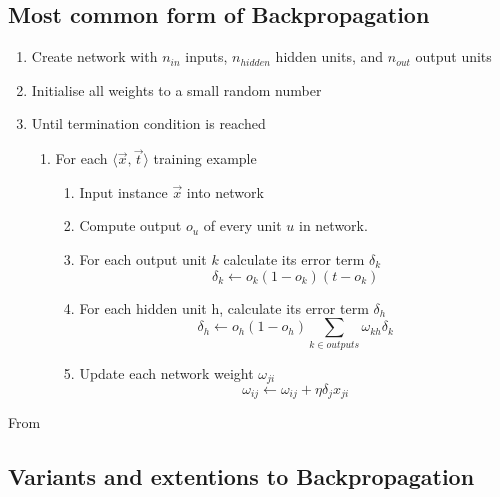 \documentclass[10pt,a4paper]{article}
\begin{document}
\subsection{Most common form of Backpropagation}
\begin{enumerate}
\item Create network with $n_{in}$ inputs, $n_{hidden}$ hidden units, and $n_{out}$ output units
\item Initialise all weights to a small random number 
\item Until termination condition is reached
    \begin{enumerate}
    \item For each $\langle\vec{x},\vec{t}\rangle$ training example
         \begin{enumerate}
         \item Input instance $\vec{x}$ into network
         \item Compute output $o_u$ of every unit $u$ in network.
         \item For each output unit $k$ calculate its error term $\delta_k$
             \begin{equation}
             \delta_k \leftarrow o_k(1-o_k)(t-o_k)
             \end{equation}
         \item For each hidden unit h, calculate its error term $\delta_h$
             \begin{equation}
             \delta_h \leftarrow o_h(1-o_h)\sum_{k\in outputs} \omega_{kh}\delta_k
             \end{equation}
         \item Update each network weight $\omega_{ji}$
             \begin{equation}
             \omega_{ij} \leftarrow \omega_{ij} + \eta \delta_j x_{ji}
             \end{equation}                                          
         \end{enumerate}                 
    \end{enumerate}
\end{enumerate}

From \cite[p98]{Michell2009}

\subsection{Variants and extentions to Backpropagation}


\end{document}
